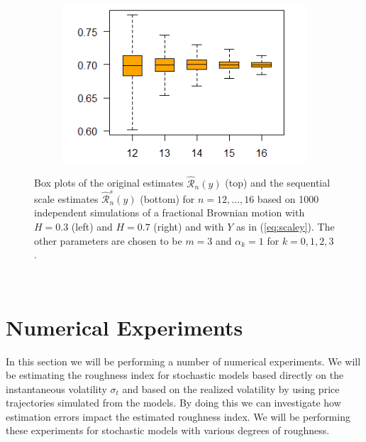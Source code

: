 \documentclass{article}
\begin{document}
\begin{figure}[htbp]
\begin{subfigure}{0.48\textwidth}
    \end{subfigure}
    \hfill
    \begin{subfigure}{0.48\textwidth}
        \includegraphics[width=\linewidth]{box2.png}
    \end{subfigure}
    
    \caption{Box plots of the original estimates $\hat{\mathscr{R}}_n (y)$ (top) and the sequential scale estimates $\hat{\mathscr{R}}_n^s (y)$ (bottom) for $n=12,...,16$ based on 1000 independent simulations of a fractional Brownian motion with $H=0.3$ (left) and $H=0.7$ (right) and with $Y$ as in (\ref{eq:scaley}). The other parameters are chosen to be $m=3$ and $\alpha_k = 1$ for $k=0,1,2,3$.} \label{fig:scaleplot}
\end{figure}\\

\section{Numerical Experiments}
In this section we will be performing a number of numerical experiments. We will be estimating the roughness index for stochastic models based directly on the instantaneous volatility $\sigma_t$ and based on the realized volatility by using price trajectories simulated from the models. By doing this we can investigate how estimation errors impact the estimated roughness index. We will be performing these experiments for stochastic models with various degrees of roughness.
\end{document}
